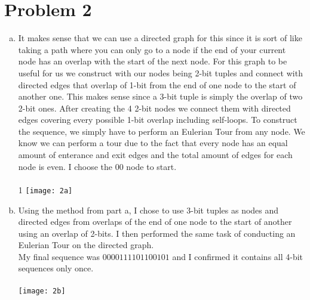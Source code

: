 \documentclass[11pt,letterpaper]{article}
\begin{document}
\section*{Problem 2}
\begin{enumerate}[(a)]
\item
It makes sense that we can use a directed graph for this since it is sort of like taking a path where you can only go to a node if the end of your current node has an overlap with the start of the next node. For this graph to be useful for us we construct with our nodes being 2-bit tuples and connect with directed edges that overlap of 1-bit from the end of one node to the start of another one. This makes sense since a 3-bit tuple is simply the overlap of two 2-bit ones. After creating the 4 2-bit nodes we connect them with directed edges covering every possible 1-bit overlap including self-loops. To construct the sequence, we simply have to perform an Eulerian Tour from any node. We know we can perform a tour due to the fact that every node has an equal amount of enterance and exit edges and the total amount of edges for each node is even. I choose the 00 node to start.\\\\1
\texttt{[image: 2a]}
\clearpage
\item
Using the method from part a, I chose to use 3-bit tuples as nodes and directed edges from overlaps of the end of one node to the start of another using an overlap of 2-bits. I then performed the same task of conducting an Eulerian Tour on the directed graph. \\
My final sequence was $0000111101100101$ and I confirmed it contains all 4-bit sequences only once.\\\\
\texttt{[image: 2b]}
\\
\end{enumerate}
\clearpage
\end{document}
